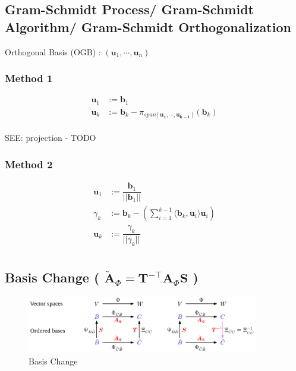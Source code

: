 \subsection{Gram-Schmidt Process/ Gram-Schmidt Algorithm/ Gram-Schmidt Orthogonalization \cite{mfml-1}}\label{Gram-Schmidt Process/ Gram-Schmidt Algorithm/ Gram-Schmidt Orthogonalization}

Orthogonal Basis (OGB) : $(\mathbf{u}_1, \cdots ,\mathbf{u}_n)$

\subsubsection*{Method 1 \cite{mfml-1}}

\begin{align*}
    \mathbf{u}_1 &:= \mathbf{b}_1 \\
    \mathbf{u}_k &:= \mathbf{b}_k - \pi_{span[\mathbf{u_1, \cdots, u_{k-1}}]}(\mathbf{b}_k) \\
\end{align*}

SEE: projection - TODO

\subsubsection*{Method 2 \cite{youtube/UOZjINOGLog-Gram-Schmidt-Orthogonalisation-Process}}

\begin{align*}
    \displaystyle
    \mathbf{u}_1 &:= \dfrac{\mathbf{b}_1}{||\mathbf{b}_1||}\\
    \gamma_k &:= \mathbf{b}_k - \left( \sum_{i=1}^{k-1} \langle \mathbf{b}_k, \mathbf{u}_i \rangle \mathbf{u}_i \right)\\
    \mathbf{u}_k &:= \dfrac{\gamma_k}{||\gamma_k||}\\
\end{align*}




\subsection{Basis Change ( $\mathbf{\tilde{A}}_\Phi = \mathbf{T^{-\top}A}_\Phi \mathbf{S}$ ) \cite{mfml-1}}\label{Basis Change}

\begin{figure}[h]
    \centering
    \includegraphics[width=\linewidth, height=2.5cm, keepaspectratio]{Pictures/maths/basis-change.png}
    \caption{Basis Change}
\end{figure}

